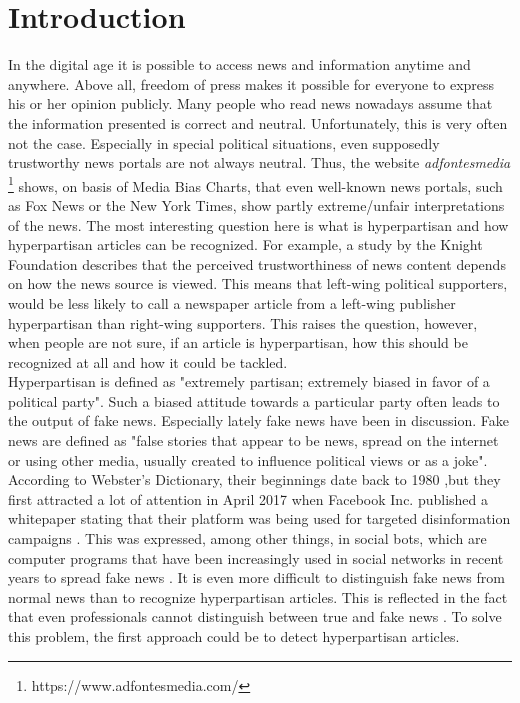 \documentclass[a4paper, 11pt,titlepage,oneside,openany]{book}
\begin{document}

\newpage



\chapter{Introduction}
In the digital age it is possible to access news and information anytime and anywhere. Above all, freedom of press makes it possible for everyone to express his or her opinion publicly. Many people who read news nowadays assume that the information presented is correct and neutral. Unfortunately, this is very often not the case. Especially in special political situations, even supposedly trustworthy news portals are not always neutral.  Thus, the website \textit{adfontesmedia} \footnote{https://www.adfontesmedia.com/} shows, on basis of Media Bias Charts, that even well-known news portals, such as Fox News or the New York Times, show partly extreme/unfair interpretations of the news. The most interesting question here is what is hyperpartisan and how hyperpartisan articles can be recognized. For example, a study by the Knight Foundation \cite{study} describes that the perceived trustworthiness of news content depends on how the news source is viewed.  This means that left-wing political supporters, would be less likely to call a newspaper article from a left-wing publisher hyperpartisan than right-wing supporters. This raises the question, however, when people are not sure, if an article is hyperpartisan, how this should be recognized at all and how it could be tackled.  \\
\indent Hyperpartisan is defined as "extremely partisan; extremely biased in favor of a political party". Such a biased attitude towards a particular party often leads to the output of fake news. Especially lately fake news have been in discussion. Fake news are defined as "false stories that appear to be news, spread on the internet or using other media, usually created to influence political views or as a joke". According to Webster's Dictionary, their beginnings date back to 1980 \cite{webster} ,but they first attracted a lot of attention in April 2017 when Facebook Inc. published a whitepaper stating that their platform was being used for targeted disinformation campaigns \cite{facebook}. This was expressed, among other things, in social bots, which are computer programs that have been increasingly used in social networks in recent years to spread fake news \cite{socialbots}. It is even more difficult to distinguish fake news from normal news than to recognize hyperpartisan articles. This is reflected in the fact that even professionals cannot distinguish between true and fake news \cite{notsure}. To solve this problem, the first approach could be to detect hyperpartisan articles.  \\
\end{document}

